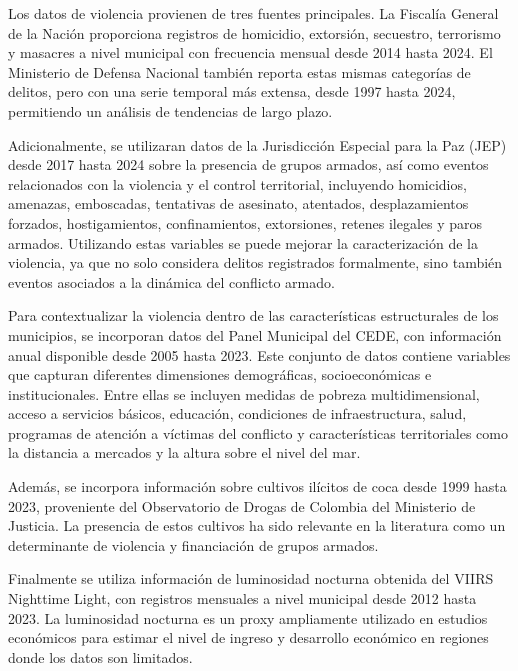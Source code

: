 Los datos de violencia provienen de tres fuentes principales. La Fiscalía General de la Nación proporciona registros de homicidio, extorsión, secuestro, terrorismo y masacres a nivel municipal con frecuencia mensual desde 2014 hasta 2024. El Ministerio de Defensa Nacional también reporta estas mismas categorías de delitos, pero con una serie temporal más extensa, desde 1997 hasta 2024, permitiendo un análisis de tendencias de largo plazo. 

Adicionalmente, se utilizaran datos de la Jurisdicción Especial para la Paz (JEP) desde 2017 hasta 2024 sobre la presencia de grupos armados, así como eventos relacionados con la violencia y el control territorial, incluyendo homicidios, amenazas, emboscadas, tentativas de asesinato, atentados, desplazamientos forzados, hostigamientos, confinamientos, extorsiones, retenes ilegales y paros armados. Utilizando estas variables se puede mejorar la caracterización de la violencia, ya que no solo considera delitos registrados formalmente, sino también eventos asociados a la dinámica del conflicto armado.

Para contextualizar la violencia dentro de las características estructurales de los municipios, se incorporan datos del Panel Municipal del CEDE, con información anual disponible desde 2005 hasta 2023. Este conjunto de datos contiene variables que capturan diferentes dimensiones demográficas, socioeconómicas e institucionales. Entre ellas se incluyen medidas de pobreza multidimensional, acceso a servicios básicos, educación, condiciones de infraestructura, salud, programas de atención a víctimas del conflicto y características territoriales como la distancia a mercados y la altura sobre el nivel del mar.

Además, se incorpora información sobre cultivos ilícitos de coca desde 1999 hasta 2023, proveniente del Observatorio de Drogas de Colombia del Ministerio de Justicia. La presencia de estos cultivos ha sido relevante en la literatura como un determinante de violencia y financiación de grupos armados. 

Finalmente se utiliza información de luminosidad nocturna obtenida del VIIRS Nighttime Light, con registros mensuales a nivel municipal desde 2012 hasta 2023. La luminosidad nocturna es un proxy ampliamente utilizado en estudios económicos para estimar el nivel de ingreso y desarrollo económico en regiones donde los datos son limitados.
